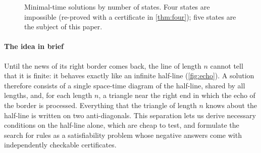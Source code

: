 \begin{figure}[t]
\centering

\caption{Minimal-time solutions by number of states. Four states are
impossible (re-proved with a certificate in \cref{thm:four}); five states
are the subject of this paper.}
\label{fig:scoreboard}
\end{figure}

\paragraph{The idea in brief}
Until the news of its right border comes back, the line of length $n$
cannot tell that it is finite: it behaves exactly like an infinite
half-line (\cref{fig:echo}). A solution therefore consists of a single
space-time diagram of the half-line, shared by all lengths, and, for each
length $n$, a triangle near the right end in which the echo of the border is
processed. Everything that the triangle of length $n$ knows about the
half-line is written on two anti-diagonals. This separation lets us derive
necessary conditions on the half-line alone, which are cheap to test, and
formulate the search for rules as a satisfiability problem whose negative
answers come with independently checkable certificates.

